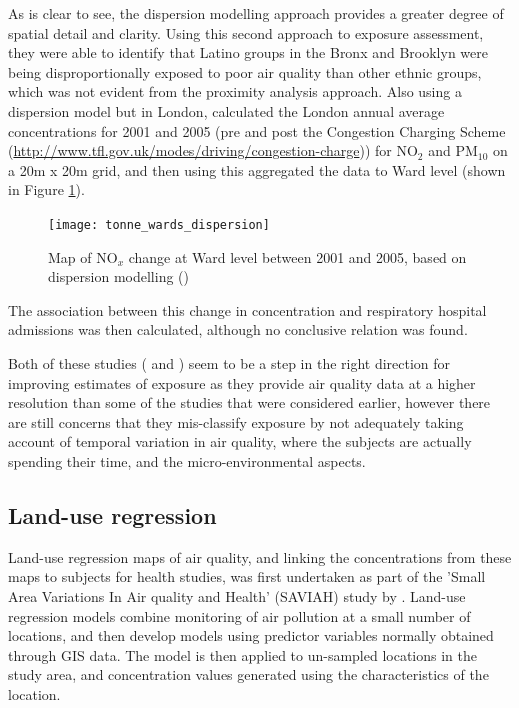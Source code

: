 As is clear to see, the dispersion modelling approach provides a greater degree of spatial detail and clarity. Using this second approach to exposure assessment, they were able to identify that Latino groups in the Bronx and Brooklyn were being disproportionally exposed to poor air quality than other ethnic groups, which was not evident from the proximity analysis approach. Also using a dispersion model but in London, \cite{Tonne2010} calculated the London annual average concentrations for 2001 and 2005 (pre and post the Congestion Charging Scheme (\url{http://www.tfl.gov.uk/modes/driving/congestion-charge})) for NO$_{2}$ and PM$_{10}$ on a 20m x 20m grid, and then using this aggregated the data to Ward level (shown in Figure \ref{fig:tonne_wards_dispersion}).

\begin{figure}[H]
\centering
\texttt{[image: tonne\_wards\_dispersion]}
\caption{Map of NO$_{x}$ change at Ward level between 2001 and 2005, based on dispersion modelling (\cite{Tonne2010})}
\label{fig:tonne_wards_dispersion}
\end{figure}

The association between this change in concentration and respiratory hospital admissions was then calculated, although no conclusive relation was found.

Both of these studies (\cite{Maroko2012} and \cite{Tonne2010}) seem to be a step in the right direction for improving estimates of exposure as they provide air quality data at a higher resolution than some of the studies that were considered earlier, however there are still concerns that they mis-classify exposure by not adequately taking account of temporal variation in air quality, where the subjects are actually spending their time, and the micro-environmental aspects.


\subsection{Land-use regression}
\label{subsec:landuseregression}

Land-use regression maps of air quality, and linking the concentrations from these maps to subjects for health studies, was first undertaken as part of the 'Small Area Variations In Air quality and Health' (SAVIAH) study by \cite{Briggs1997}. Land-use regression models combine monitoring of air pollution at a small number of locations, and then develop models using predictor variables normally obtained through GIS data. The model is then applied to un-sampled locations in the study area, and concentration values generated using the characteristics of the location.

